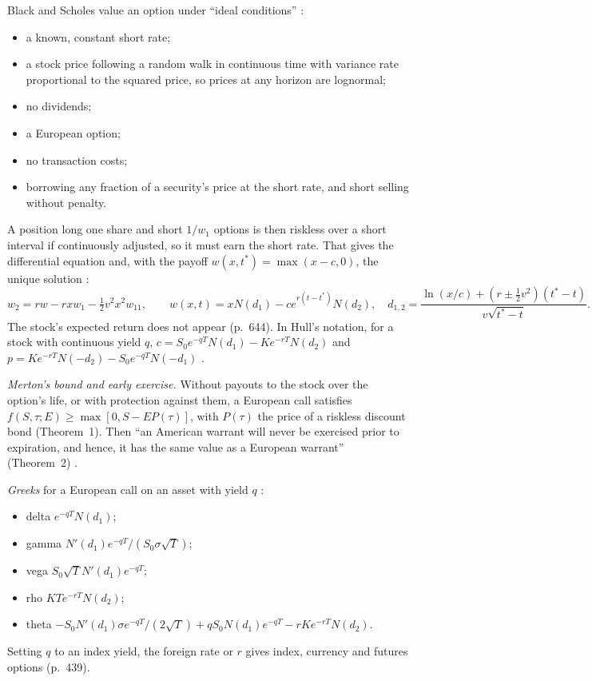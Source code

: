 \begin{qfmodel}\label{mod:black-scholes-merton}
 Black and Scholes value an option under ``ideal conditions'' \citep[``The Valuation Formula'', pp.~640--641]{s6-blackscholes}:
\begin{itemize}
\item a known, constant short rate;
\item a stock price following a random walk in continuous time with variance rate proportional to the squared price, so prices at any horizon are lognormal;
\item no dividends;
\item a European option;
\item no transaction costs;
\item borrowing any fraction of a security's price at the short rate, and short selling without penalty.
\end{itemize}
A position long one share and short $1/w_1$ options is then riskless over a short interval if continuously adjusted, so it must earn the short rate. That gives the differential equation and, with the payoff $w(x,t^*)=\max(x-c,0)$, the unique solution \citep[eqs.~(7), (8) and~(13), pp.~643--644]{s6-blackscholes}:
\[ w_2=rw-rxw_1-\tfrac12v^2x^2w_{11},\qquad w(x,t)=xN(d_1)-ce^{r(t-t^*)}N(d_2),\quad d_{1,2}=\frac{\ln(x/c)+(r\pm\frac12v^2)(t^*-t)}{v\sqrt{t^*-t}}. \]
The stock's expected return does not appear (p.~644). In Hull's notation, for a stock with continuous yield $q$, $c=S_0e^{-qT}N(d_1)-Ke^{-rT}N(d_2)$ and $p=Ke^{-rT}N(-d_2)-S_0e^{-qT}N(-d_1)$ \citep[chap.~15, eqs.~(15.20)--(15.21), p.~352, for $q=0$; the yield version through chap.~17 and Table~19.6, p.~439]{s7-hulloptions}.

\emph{Merton's bound and early exercise.} Without payouts to the stock over the option's life, or with protection against them, a European call satisfies $f(S,\tau;E)\ge\max[0,S-EP(\tau)]$, with $P(\tau)$ the price of a riskless discount bond (Theorem~1). Then ``an American warrant will never be exercised prior to expiration, and hence, it has the same value as a European warrant'' (Theorem~2) \citep[p.~144]{p2-merton}.

\emph{Greeks} for a European call on an asset with yield $q$ \citep[chap.~19, Table~19.6, p.~439]{s7-hulloptions}:
\begin{itemize}
\item delta $e^{-qT}N(d_1)$;
\item gamma $N'(d_1)e^{-qT}/(S_0\sigma\sqrt T)$;
\item vega $S_0\sqrt TN'(d_1)e^{-qT}$;
\item rho $KTe^{-rT}N(d_2)$;
\item theta $-S_0N'(d_1)\sigma e^{-qT}/(2\sqrt T)+qS_0N(d_1)e^{-qT}-rKe^{-rT}N(d_2)$.
\end{itemize}
Setting $q$ to an index yield, the foreign rate or $r$ gives index, currency and futures options (p.~439).


\end{qfmodel}
